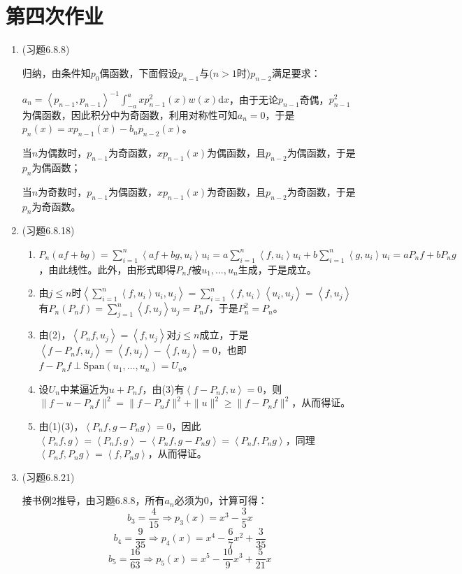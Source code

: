\documentclass[a4paper,UTF8,fontset=windows]{ctexart}
\begin{document}
\section{第四次作业}
\begin{enumerate}
    \item (习题6.8.8)
    
    归纳，由条件知$p_0$偶函数，下面假设$p_{n-1}$与($n>1$时)$p_{n-2}$满足要求：
    
    $a_n=\left<p_{n-1},p_{n-1}\right>^{-1}\int_{-a}^axp_{n-1}^2(x)w(x)\mathrm{d}x$，由于无论$p_{n-1}$奇偶，$p_{n-1}^2$为偶函数，因此积分中为奇函数，利用对称性可知$a_n=0$，于是$p_n(x)=xp_{n-1}(x)-b_np_{n-2}(x)$。
    
    当$n$为偶数时，$p_{n-1}$为奇函数，$xp_{n-1}(x)$为偶函数，且$p_{n-2}$为偶函数，于是$p_n$为偶函数；
    
    当$n$为奇数时，$p_{n-1}$为偶函数，$xp_{n-1}(x)$为奇函数，且$p_{n-2}$为奇函数，于是$p_n$为奇函数。
    
    \item (习题6.8.18)
    \begin{enumerate}[(1)]
        \item $P_n(af+bg)=\sum_{i=1}^n\left<af+bg,u_i\right>u_i=a\sum_{i=1}^n\left<f,u_i\right>u_i+b\sum_{i=1}^n\left<g,u_i\right>u_i=aP_nf+bP_ng$，由此线性。此外，由形式即得$P_nf$被$u_1,\dots,u_n$生成，于是成立。
        \item 由$j\le n$时$\left<\sum_{i=1}^n\left<f,u_i\right>u_i,u_j\right>=\sum_{i=1}^n\left<f,u_i\right>\left<u_i,u_j\right>=\left<f,u_j\right>$有$P_n(P_nf)=\sum_{j=1}^n\left<f,u_j\right>u_j=P_nf$，于是$P_n^2=P_n$。
        \item 由(2)，$\left<P_nf,u_j\right>=\left<f,u_j\right>$对$j\le n$成立，于是$\left<f-P_nf,u_j\right>=\left<f,u_j\right>-\left<f,u_j\right>=0$，也即$f-P_nf\ \bot\ \mathrm{Span}(u_1,\dots,u_n)=U_n$。
        \item 设$U_n$中某逼近为$u+P_nf$，由(3)有$\left<f-P_nf,u\right>=0$，则$\|f-u-P_nf\|^2=\|f-P_nf\|^2+\|u\|^2\ge\|f-P_nf\|^2$，从而得证。
        \item 由(1)(3)，$\left<P_nf,g-P_ng\right>=0$，因此$\left<P_nf,g\right>=\left<P_nf,g\right>-\left<P_nf,g-P_ng\right>=\left<P_nf,P_ng\right>$，同理$\left<P_nf,P_ng\right>=\left<f,P_ng\right>$，从而得证。
    \end{enumerate}
    
    \item (习题6.8.21)
    
    接书例2推导，由习题6.8.8，所有$a_n$必须为0，计算可得：
    $$b_3=\frac{4}{15}\Rightarrow p_3(x)=x^3-\frac{3}{5}x$$
    $$b_4=\frac{9}{35}\Rightarrow p_4(x)=x^4-\frac{6}{7}x^2+\frac{3}{35}$$
    $$b_5=\frac{16}{63}\Rightarrow p_5(x)=x^5-\frac{10}{9}x^3+\frac{5}{21}x$$
    

\end{enumerate}
\end{document}
